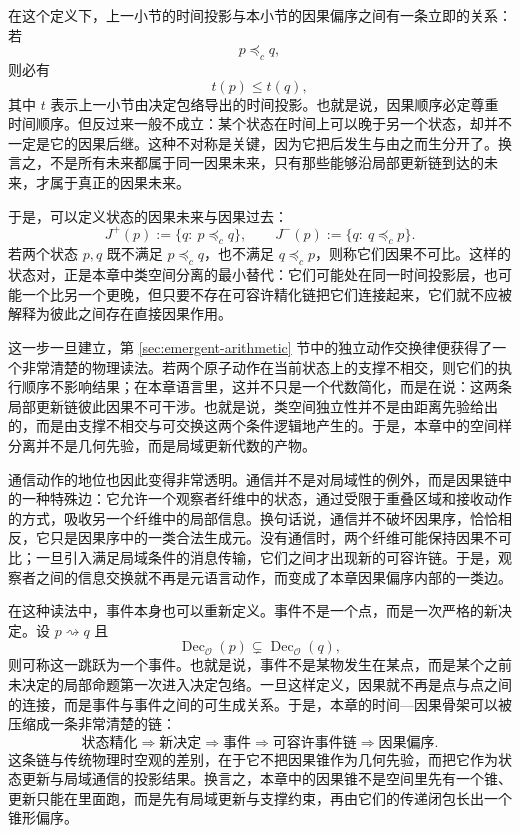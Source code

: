 在这个定义下，上一小节的时间投影与本小节的因果偏序之间有一条立即的关系：若
\[
p\preceq_c q,
\]
则必有
\[
t(p)\le t(q),
\]
其中 \(t\) 表示上一小节由决定包络导出的时间投影。也就是说，因果顺序必定尊重时间顺序。但反过来一般不成立：某个状态在时间上可以晚于另一个状态，却并不一定是它的因果后继。这种不对称是关键，因为它把后发生与由之而生分开了。换言之，不是所有未来都属于同一因果未来，只有那些能够沿局部更新链到达的未来，才属于真正的因果未来。

于是，可以定义状态的因果未来与因果过去：
\[
J^+(p):=\{q:\ p\preceq_c q\},
\qquad
J^-(p):=\{q:\ q\preceq_c p\}.
\]
若两个状态 \(p,q\) 既不满足 \(p\preceq_c q\)，也不满足 \(q\preceq_c p\)，则称它们因果不可比。这样的状态对，正是本章中类空间分离的最小替代：它们可能处在同一时间投影层，也可能一个比另一个更晚，但只要不存在可容许精化链把它们连接起来，它们就不应被解释为彼此之间存在直接因果作用。

这一步一旦建立，第 \ref{sec:emergent-arithmetic} 节中的独立动作交换律便获得了一个非常清楚的物理读法。若两个原子动作在当前状态上的支撑不相交，则它们的执行顺序不影响结果；在本章语言里，这并不只是一个代数简化，而是在说：这两条局部更新链彼此因果不可干涉。也就是说，类空间独立性并不是由距离先验给出的，而是由支撑不相交与可交换这两个条件逻辑地产生的。于是，本章中的空间样分离并不是几何先验，而是局域更新代数的产物。

通信动作的地位也因此变得非常透明。通信并不是对局域性的例外，而是因果链中的一种特殊边：它允许一个观察者纤维中的状态，通过受限于重叠区域和接收动作的方式，吸收另一个纤维中的局部信息。换句话说，通信并不破坏因果序，恰恰相反，它只是因果序中的一类合法生成元。没有通信时，两个纤维可能保持因果不可比；一旦引入满足局域条件的消息传输，它们之间才出现新的可容许链。于是，观察者之间的信息交换就不再是元语言动作，而变成了本章因果偏序内部的一类边。

在这种读法中，事件本身也可以重新定义。事件不是一个点，而是一次严格的新决定。设 \(p\rightsquigarrow q\) 且
\[
\operatorname{Dec}_{\mathcal O}(p)\subsetneq \operatorname{Dec}_{\mathcal O}(q),
\]
则可称这一跳跃为一个事件。也就是说，事件不是某物发生在某点，而是某个之前未决定的局部命题第一次进入决定包络。一旦这样定义，因果就不再是点与点之间的连接，而是事件与事件之间的可生成关系。于是，本章的时间—因果骨架可以被压缩成一条非常清楚的链：
\[
\text{状态精化}
\Longrightarrow
\text{新决定}
\Longrightarrow
\text{事件}
\Longrightarrow
\text{可容许事件链}
\Longrightarrow
\text{因果偏序}.
\]
这条链与传统物理时空观的差别，在于它不把因果锥作为几何先验，而把它作为状态更新与局域通信的投影结果。换言之，本章中的因果锥不是空间里先有一个锥、更新只能在里面跑，而是先有局域更新与支撑约束，再由它们的传递闭包长出一个锥形偏序。

